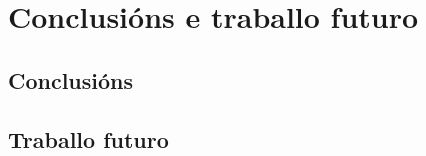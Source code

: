 %
%
\chapter[Conclusións e traballo futuro]{
	Conclusións e traballo futuro
	\label{ch.cet}
}

%
%
\section[Conclusións]{
	Conclusións}

\section[Traballo futuro]{
	Traballo futuro}

